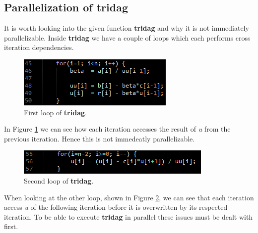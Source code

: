 \subsection{Parallelization of tridag}
It is worth looking into the given function \textbf{tridag} and why it is not
immediately parallelizable. Inside \textbf{tridag} we have a couple of
loops which each performs cross iteration dependencies.

\begin{figure}[!ht]
	\centering
		\includegraphics[scale=1]{input/figures/tridag_loop1.png}
		\caption{First loop of \textbf{tridag}.\label{fig:tridag_loop1}}
\end{figure}

In Figure \ref{fig:tridag_loop1} we can see how each iteration accesses
the result of \emph{u} from the previous iteration. Hence this is not
immedeatly parallelizable.

\begin{figure}[!ht]
	\centering
		\includegraphics[scale=1]{input/figures/tridag_loop2.png}
		\caption{Second loop of \textbf{tridag}.\label{fig:tridag_loop2}}
\end{figure}

When looking at the other loop, shown in Figure \ref{fig:tridag_loop2}, we can see that each iteration access \emph{u} of the following iteration before it is overwritten by its respected iteration.
To be able to execute \textbf{tridag} in parallel these issues must be dealt with first.
